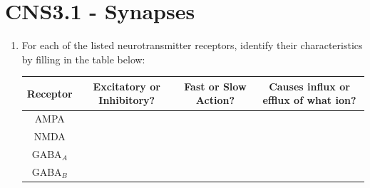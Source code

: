 \documentclass[11pt,letterpaper]{article}
\begin{document}
\maketitle
\thispagestyle{first}

\section{CNS3.1 - Synapses}
\begin{enumerate}
    \item For each of the listed neurotransmitter receptors, identify their characteristics by filling in the table below:
    \begin{table}[h]
        \centering
        \begin{tabular}{|c|c|c|c|}
            \hline
            Receptor & Excitatory or Inhibitory? & Fast or Slow Action? & Causes influx or efflux of what ion?\\
            \hline
            \hline
            AMPA & & &\\
            \hline
            NMDA & & &\\
            \hline
            GABA$_A$ & & &\\
            \hline
            GABA$_B$ & & &\\
        \hline
        \end{tabular}
    \end{table}


\end{enumerate}
\end{document}
